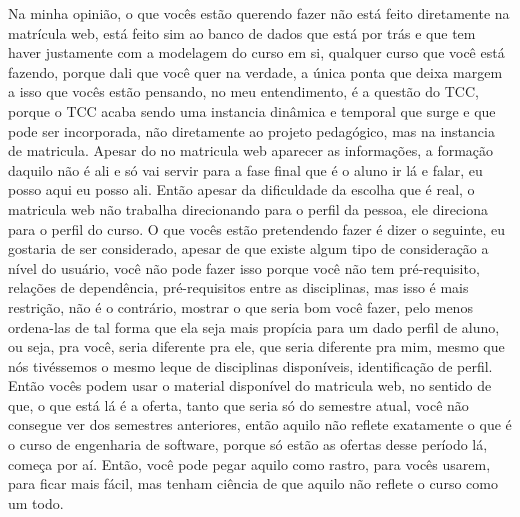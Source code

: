 \begin{enumerate}
		Na minha opinião, o que vocês estão querendo fazer não está feito diretamente na matrícula web, está feito sim ao banco de dados que está por trás e que tem haver justamente com a modelagem do curso em si, qualquer curso que você está fazendo, porque dali que você quer na verdade, a única ponta que deixa margem a isso que vocês estão pensando, no meu entendimento, é a questão do TCC, porque o TCC acaba sendo uma instancia dinâmica e temporal que surge e que pode ser incorporada, não diretamente ao projeto pedagógico, mas na instancia de matricula. Apesar do no matricula web aparecer as informações, a formação daquilo não é ali e só vai servir para a fase final que é o aluno ir lá e falar, eu posso aqui eu posso ali. Então apesar da dificuldade da escolha que é real, o matricula web não trabalha direcionando para o perfil da pessoa, ele direciona para o perfil do curso. O que vocês estão pretendendo fazer é dizer o seguinte, eu gostaria de ser considerado, apesar de que existe algum tipo de consideração a nível do usuário, você não pode fazer isso porque você não tem pré-requisito, relações de dependência, pré-requisitos entre as disciplinas, mas isso é mais restrição, não é o contrário, mostrar o que seria bom você fazer, pelo menos ordena-las de tal forma que ela seja mais propícia para um dado perfil de aluno, ou seja, pra você, seria diferente pra ele, que seria diferente pra mim, mesmo que nós tivéssemos o mesmo leque de disciplinas disponíveis, identificação de perfil. Então vocês podem usar o material disponível do matricula web, no sentido de que, o que está lá é a oferta, tanto que seria só do semestre atual, você não consegue ver dos semestres anteriores, então aquilo não reflete exatamente o que é o curso de engenharia de software, porque só estão as ofertas desse período lá, começa por aí. Então, você pode pegar aquilo como rastro, para vocês usarem, para ficar mais fácil, mas tenham ciência de que aquilo não reflete o curso como um todo.


\end{enumerate}
